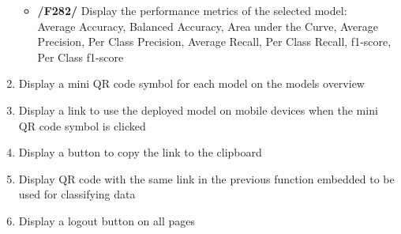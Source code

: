 \begin{enumerate}[{label = \textbf{/F{\protect\twodigits{\arabic{enumi}}}0/}, leftmargin = *}]
\begin{itemize}
        \item \label{itm:models-over-2}\textbf{/F282/} Display the performance metrics of the selected model: \\Average Accuracy, Balanced Accuracy, Area under the Curve, Average Precision, Per Class Precision, Average Recall, Per Class Recall, f1-score, Per Class f1-score
    \end{itemize}
    \item \label{itm:disp-miniqr-classify}Display a mini QR code symbol for each model on the models overview
    \item \label{itm:disp-link-classify}Display a link to use the deployed model on mobile devices when the mini QR code symbol is clicked
    \item \label{itm:disp-copy-classify}Display a button to copy the link to the clipboard
    \item \label{itm:disp-qr-classify}Display QR code with the same link in the previous function embedded to be used for classifying data
    \item Display a logout button on all pages
\end{enumerate}

